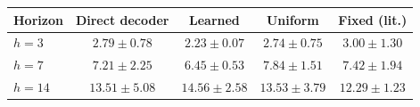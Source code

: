 \begin{tabular}{lcccc}
\hline
Horizon & Direct decoder & Learned & Uniform & Fixed (lit.) \\
\hline
$h=3$ & $2.79 \pm 0.78$ & $\mathbf{2.23 \pm 0.07}$ & $2.74 \pm 0.75$ & $3.00 \pm 1.30$ \\
$h=7$ & $7.21 \pm 2.25$ & $\mathbf{6.45 \pm 0.53}$ & $7.84 \pm 1.51$ & $7.42 \pm 1.94$ \\
$h=14$ & $13.51 \pm 5.08$ & $14.56 \pm 2.58$ & $13.53 \pm 3.79$ & $\mathbf{12.29 \pm 1.23}$ \\
\hline
\end{tabular}
